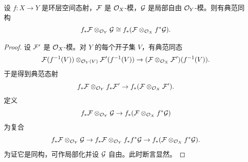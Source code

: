 \begin{lemma}\label{it:1.4.26}
设 $f\colon X\to Y$ 是环层空间态射，$\cF$ 是 $\cO_X$-模，$\cG$ 是局部自由 $\cO_Y$-模。则有典范同构
\[
f_*\cF\otimes_{\cO_Y}\cG\cong f_*(\cF\otimes_{\cO_X}f^*\cG).
\]
\end{lemma}

\begin{proof}
设 $\cF'$ 是 $\cO_X$-模。对 $Y$ 的每个开子集 $V$，有典范同态
\[
\cF(f^{-1}(V))\otimes_{\cO_Y(V)}\cF'(f^{-1}(V))\to(\cF\otimes_{\cO_X}\cF')(f^{-1}(V)).
\]
于是得到典范态射
\[
f_*\cF\otimes_{\cO_Y}f_*\cF'\to f_*(\cF\otimes_{\cO_X}\cF').
\]
定义
\[
f_*\cF\otimes_{\cO_Y}\cG\to f_*(\cF\otimes_{\cO_X}f^*\cG)
\]
为复合
\[
f_*\cF\otimes_{\cO_Y}\cG\to f_*\cF\otimes_{\cO_Y}f_*f^*\cG\to f_*(\cF\otimes_{\cO_X}f^*\cG).
\]
为证它是同构，可作局部化并设 $\cG$ 自由。此时断言显然。
\end{proof}

